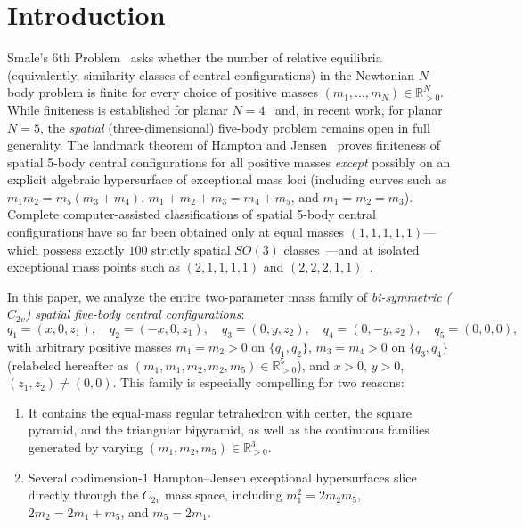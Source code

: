 \documentclass[11pt,a4paper]{amsart}
\theoremstyle{definition}
\theoremstyle{remark}
\newcommand{\R}{\mathbb{R}}
\begin{document}
\maketitle

\section{Introduction}

Smale's 6th Problem~\cite{Smale1998} asks whether the number of relative equilibria
(equivalently, similarity classes of central configurations) in the Newtonian $N$-body
problem is finite for every choice of positive masses $(m_1, \dots, m_N) \in \R_{>0}^N$.
While finiteness is established for planar $N = 4$~\cite{HamptonMoeckel2006} and, in
recent work, for planar $N = 5$, the \emph{spatial} (three-dimensional) five-body
problem remains open in full generality.
The landmark theorem of Hampton and Jensen~\cite{HamptonJensen2011} proves finiteness of
spatial 5-body central configurations for all positive masses \emph{except} possibly on
an explicit algebraic hypersurface of exceptional mass loci (including curves such as
$m_1 m_2 = m_5 (m_3 + m_4)$, $m_1 + m_2 + m_3 = m_4 + m_5$, and $m_1 = m_2 = m_3$).
Complete computer-assisted classifications of spatial 5-body central configurations have
so far been obtained only at equal masses $(1,1,1,1,1)$---which possess exactly $100$
strictly spatial $SO(3)$ classes~\cite{MoczuradZgliczynski2020}---and at isolated
exceptional mass points such as $(2,1,1,1,1)$ and $(2,2,2,1,1)$~\cite{MoczuradZgliczynski2026}.

In this paper, we analyze the entire two-parameter mass family of
\emph{bi-symmetric ($C_{2v}$) spatial five-body central configurations}:
\begin{equation}\label{eq:c2v-coords}
  q_1 = (x, 0, z_1),\quad q_2 = (-x, 0, z_1),\quad
  q_3 = (0, y, z_2),\quad q_4 = (0, -y, z_2),\quad
  q_5 = (0, 0, 0),
\end{equation}
with arbitrary positive masses $m_1 = m_2 > 0$ on $\{q_1, q_2\}$, $m_3 = m_4 > 0$ on
$\{q_3, q_4\}$ (relabeled hereafter as $(m_1, m_1, m_2, m_2, m_5) \in \R_{>0}^5$), and
$x > 0$, $y > 0$, $(z_1, z_2) \neq (0,0)$.
This family is especially compelling for two reasons:
\begin{enumerate}[label=(\roman*)]
  \item It contains the equal-mass regular tetrahedron with center, the square pyramid,
        and the triangular bipyramid, as well as the continuous families generated by
        varying $(m_1, m_2, m_5) \in \R_{>0}^3$.
  \item Several codimension-1 Hampton--Jensen exceptional hypersurfaces slice directly
        through the $C_{2v}$ mass space, including $m_1^2 = 2 m_2 m_5$,
        $2 m_2 = 2 m_1 + m_5$, and $m_5 = 2 m_1$.
\end{enumerate}
\end{document}
